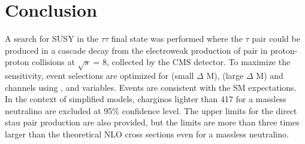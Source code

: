 \section{Conclusion}
\label{sect:conclusion}
A search for SUSY in the $\tau\tau$ final state was performed where the
$\tau$ pair could be produced in a cascade decay from the electroweak production of \PSGcpDo pair
in proton-proton collisions at $\sqrt{s}$ = 8\TeV, collected by the CMS detector.
To maximize the sensitivity, event selections are optimized for \tauTau (small $\Delta$ M), 
\tauTau (large $\Delta$ M) and \leptonTau channels using \mttwo, \tauMT and \SumMT variables.
Events are consistent with the SM expectations. 
In the context of simplified models, charginos lighter than 417\GeV 
for a massless neutralino  are excluded at 95\% confidence level.
The upper limits for the direct stau pair production are also provided, but the limits are more than three times
larger than the theoretical NLO cross sections 
even for a massless neutralino.

